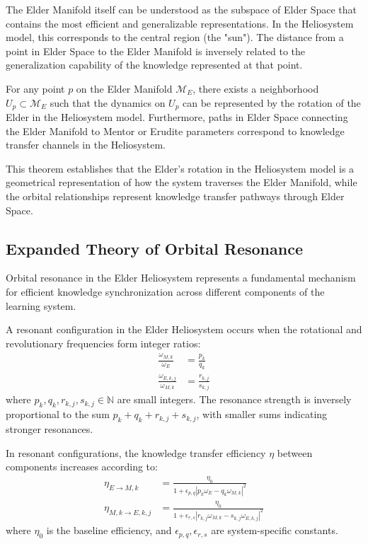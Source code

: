 The Elder Manifold itself can be understood as the subspace of Elder Space that contains the most efficient and generalizable representations. In the Heliosystem model, this corresponds to the central region (the "sun"). The distance from a point in Elder Space to the Elder Manifold is inversely related to the generalization capability of the knowledge represented at that point.

\begin{theorem}
For any point $p$ on the Elder Manifold $\mathcal{M}_E$, there exists a neighborhood $U_p \subset \mathcal{M}_E$ such that the dynamics on $U_p$ can be represented by the rotation of the Elder in the Heliosystem model. Furthermore, paths in Elder Space connecting the Elder Manifold to Mentor or Erudite parameters correspond to knowledge transfer channels in the Heliosystem.
\end{theorem}

This theorem establishes that the Elder's rotation in the Heliosystem model is a geometrical representation of how the system traverses the Elder Manifold, while the orbital relationships represent knowledge transfer pathways through Elder Space.

\subsection{Expanded Theory of Orbital Resonance}

Orbital resonance in the Elder Heliosystem represents a fundamental mechanism for efficient knowledge synchronization across different components of the learning system.

\begin{definition}
A resonant configuration in the Elder Heliosystem occurs when the rotational and revolutionary frequencies form integer ratios:
\begin{align}
\frac{\omega_{M,k}}{\omega_E} &= \frac{p_k}{q_k}\\
\frac{\omega_{E,k,j}}{\omega_{M,k}} &= \frac{r_{k,j}}{s_{k,j}}
\end{align}
where $p_k, q_k, r_{k,j}, s_{k,j} \in \mathbb{N}$ are small integers. The resonance strength is inversely proportional to the sum $p_k + q_k + r_{k,j} + s_{k,j}$, with smaller sums indicating stronger resonances.
\end{definition}

\begin{theorem}
In resonant configurations, the knowledge transfer efficiency $\eta$ between components increases according to:
\begin{align}
\eta_{E \rightarrow M,k} &= \frac{\eta_0}{1 + \epsilon_{p,q}|p_k\omega_E - q_k\omega_{M,k}|^2}\\
\eta_{M,k \rightarrow E,k,j} &= \frac{\eta_0}{1 + \epsilon_{r,s}|r_{k,j}\omega_{M,k} - s_{k,j}\omega_{E,k,j}|^2}
\end{align}
where $\eta_0$ is the baseline efficiency, and $\epsilon_{p,q}, \epsilon_{r,s}$ are system-specific constants.
\end{theorem}

